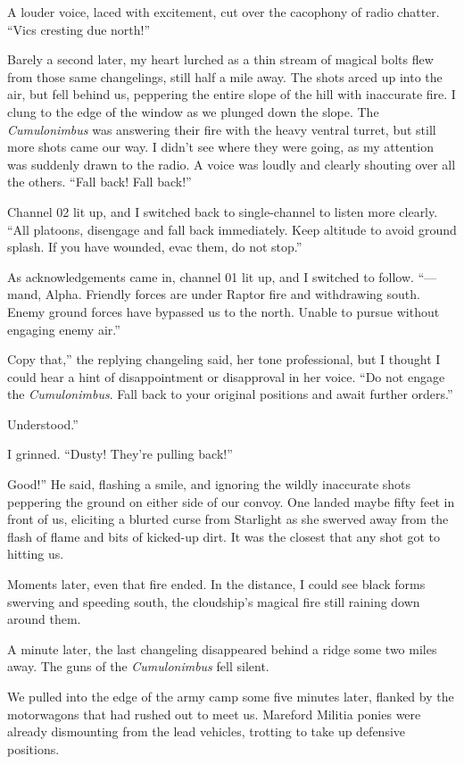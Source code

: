A louder voice, laced with excitement, cut over the cacophony of radio chatter. “Vics cresting due north!”

Barely a second later, my heart lurched as a thin stream of magical bolts flew from those same changelings, still half a mile away. The shots arced up into the air, but fell behind us, peppering the entire slope of the hill with inaccurate fire. I clung to the edge of the window as we plunged down the slope. The \textit{Cumulonimbus} was answering their fire with the heavy ventral turret, but still more shots came our way. I didn’t see where they were going, as my attention was suddenly drawn to the radio. A voice was loudly and clearly shouting over all the others. “Fall back! Fall back!”

Channel 02 lit up, and I switched back to single-channel to listen more clearly. “All platoons, disengage and fall back immediately. Keep altitude to avoid ground splash. If you have wounded, evac them, do not stop.”

As acknowledgements came in, channel 01 lit up, and I switched to follow. “—mand, Alpha. Friendly forces are under Raptor fire and withdrawing south. Enemy ground forces have bypassed us to the north. Unable to pursue without engaging enemy air.”

\leavevmode{}Copy that,” the replying changeling said, her tone professional, but I thought I could hear a hint of disappointment or disapproval in her voice. “Do not engage the \textit{Cumulonimbus}. Fall back to your original positions and await further orders.”

\leavevmode{}Understood.”

I grinned. “Dusty! They’re pulling back!”

\leavevmode{}Good!” He said, flashing a smile, and ignoring the wildly inaccurate shots peppering the ground on either side of our convoy. One landed maybe fifty feet in front of us, eliciting a blurted curse from Starlight as she swerved away from the flash of flame and bits of kicked-up dirt. It was the closest that any shot got to hitting us.

Moments later, even that fire ended. In the distance, I could see black forms swerving and speeding south, the cloudship’s magical fire still raining down around them.

A minute later, the last changeling disappeared behind a ridge some two miles away. The guns of the \textit{Cumulonimbus} fell silent.

{\br}%
We pulled into the edge of the army camp some five minutes later, flanked by the motorwagons that had rushed out to meet us. Mareford Militia ponies were already dismounting from the lead vehicles, trotting to take up defensive positions.

